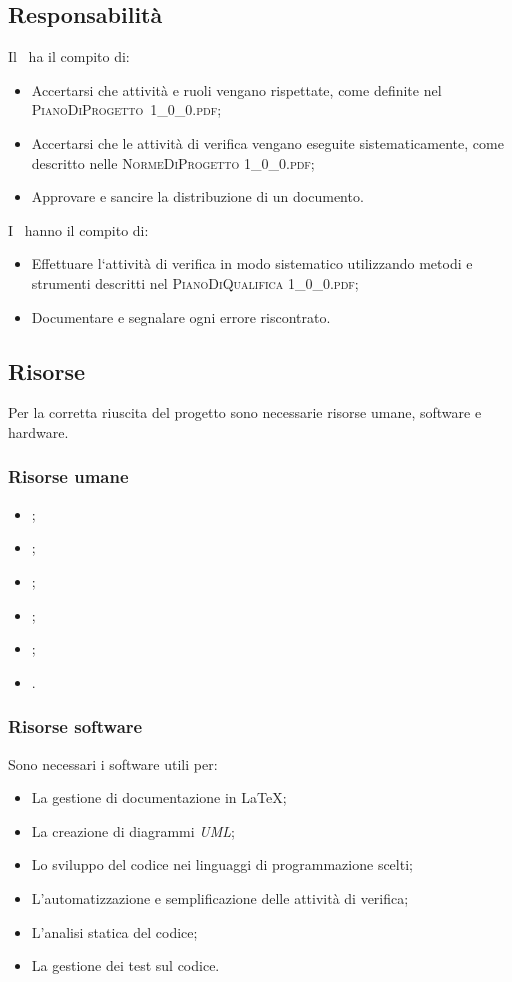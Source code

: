 	
	\subsection{Responsabilità}
	Il \textit{\RdP}\ ha il compito di:
	\begin{itemize}
		\item Accertarsi che attività e ruoli vengano rispettate, come definite nel \hbox{\textsc{PianoDiProgetto 1\_0\_0.pdf}};
		\item Accertarsi che le attività di verifica vengano eseguite sistematicamente, come descritto nelle \textsc{NormeDiProgetto 1\_0\_0.pdf};
		\item Approvare e sancire la distribuzione di un documento.
	\end{itemize}

	I \textit{\Vers}\ hanno il compito di:
	\begin{itemize}
		\item Effettuare l‘attività di verifica in modo sistematico utilizzando metodi e strumenti descritti nel \textsc{PianoDiQualifica 1\_0\_0.pdf};
		\item Documentare e segnalare ogni errore riscontrato.
	\end{itemize}	
	
	
	\subsection{Risorse}
	Per la corretta riuscita del progetto sono necessarie risorse umane, software e hardware.
	
		\subsubsection{Risorse umane}
		\begin{itemize}
			\item \textit{\RdP};
			\item \textit{\Res};
			\item \textit{\Amm};
			\item \textit{\Ver};
			\item \textit{\Prog};
			\item \textit{\Ana}.
		\end{itemize}
		
		\subsubsection{Risorse software}
		Sono necessari i software utili per:
		\begin{itemize}
			\item La gestione di documentazione in \LaTeX;
			\item La creazione di diagrammi \textit{UML};
			\item Lo sviluppo del codice nei linguaggi di programmazione scelti;
			\item L'automatizzazione e semplificazione delle attività di verifica;
			\item L'analisi statica del codice;
			\item La gestione dei test sul codice.
		\end{itemize}
		
